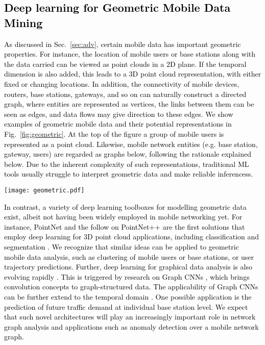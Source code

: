 \documentclass[journal,comsoc,letter]{IEEEtran}
\newcommand{\rev}[1]{\textcolor{black}{#1}}
\begin{document}
\subsection{\rev{Deep learning for Geometric Mobile Data Mining}}
\rev{As discussed in Sec.~\ref{sec:adv}, certain mobile data has important geometric properties. For instance, the location of mobile users or base stations along with the data carried can be viewed as point clouds in a 2D plane. If the temporal dimension is also added, this leads to a 3D point cloud representation, with either fixed or changing locations. In addition, the connectivity of mobile devices, routers, base stations, gateways, and so on can naturally construct a directed graph, where entities are represented as vertices, the links between them can be seen as edges, and data flows  may give direction to these edges. We show examples of geometric mobile data and their potential representations in Fig.~\ref{fig:geometric}. At the top of the figure a group of mobile users is represented as a point cloud. Likewise, mobile network entities (e.g. base station, gateway, users) are regarded as graphs below, following the rationale explained below. Due to the inherent complexity of such representations, traditional ML tools usually struggle to interpret geometric data and make reliable inferencess.}

\begin{figure*}[t]
\begin{center}
\texttt{[image: geometric.pdf]}
\end{center}
\caption{\label{fig:geometric} \rev{Examples of mobile data with geometric properties (left), their geometric representations (middle) and their candidate models for analysis (right). PointNet++ could be used to infer user trajectories when fed with point cloud representations of user locations (above); A GraphCNN may be employed to forecast future mobile traffic demand at base station level (below).}}
\end{figure*}

\rev{In contrast, a variety of deep learning toolboxes for modelling geometric data exist, albeit not having been widely employed in mobile networking yet. For instance, PointNet \cite{charles2017pointnet} and the follow on PointNet++ \cite{qi2017pointnet} are the first solutions that employ deep learning for 3D point cloud applications, including classification and segmentation \cite{ioannidou2017deep}. We recognize that similar ideas can be applied to geometric mobile data analysis, such as clustering of mobile users or base stations, or user trajectory predictions. Further, deep learning for graphical data analysis is also evolving rapidly \cite{scarselli2009graph}. This is triggered by  research on Graph CNNs \cite{kipf2016semi}, which brings convolution concepts to graph-structured data. The applicability of Graph CNNs can be further extend to the temporal domain \cite{yuan2017temporal}. One possible application is the prediction of future traffic demand at individual base station level. We expect that such novel architectures will play an increasingly important role in network graph analysis and applications such as anomaly detection over a mobile network graph.}
\end{document}
